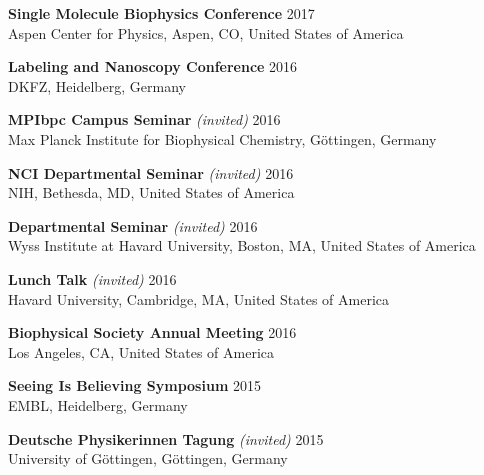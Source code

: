 \documentclass[margin,line]{res}
\begin{document}
\begin{resume}
\vspace*{-3mm}
{\bf Single Molecule Biophysics Conference}  \hfill 2017\\
Aspen Center for Physics, Aspen, CO, United States of America

\vspace*{-3mm}
{\bf Labeling and Nanoscopy Conference} \hfill 2016\\
DKFZ, Heidelberg, Germany

\vspace*{-3mm}
{\bf MPIbpc Campus Seminar} {\it (invited)}  \hfill 2016\\
Max Planck Institute for Biophysical Chemistry, Göttingen, Germany

\vspace*{-3mm}
{\bf NCI Departmental Seminar} {\it (invited)}  \hfill 2016\\
NIH, Bethesda, MD, United States of America

\vspace*{-3mm}
{\bf Departmental Seminar} {\it (invited)} \hfill 2016\\
Wyss Institute at Havard University, Boston, MA, United States of America

\vspace*{-3mm}
{\bf Lunch Talk} {\it (invited)}  \hfill 2016\\
Havard University, Cambridge, MA, United States of America

\vspace*{-3mm}
{\bf Biophysical Society Annual Meeting}  \hfill 2016\\
Los Angeles, CA, United States of America

\vspace*{-3mm}
{\bf Seeing Is Believing Symposium}  \hfill 2015\\
EMBL, Heidelberg, Germany

\vspace*{-3mm}
{\bf Deutsche Physikerinnen Tagung} {\it (invited)}  \hfill 2015\\
University of Göttingen, Göttingen, Germany


\end{resume}
\end{document}
